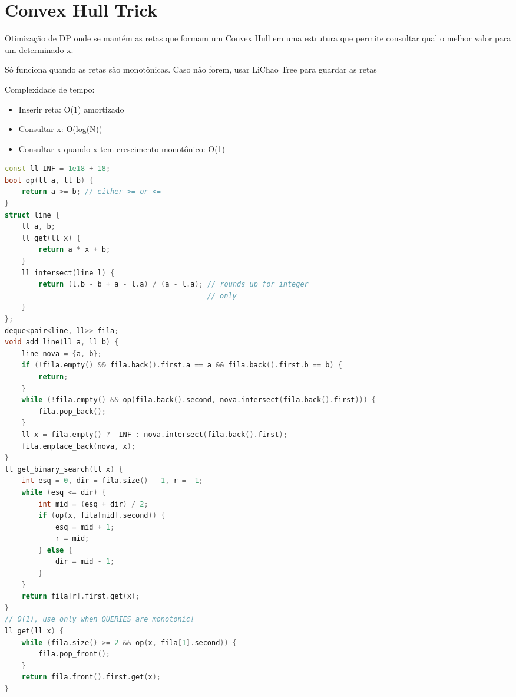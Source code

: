 \documentclass[11pt, a4paper, oneside]{book}
\begin{document}
\hfill

\section{Convex Hull Trick}


Otimização de DP onde se mantém as retas que formam um Convex Hull em uma estrutura que permite consultar qual o melhor valor para um determinado x.



Só funciona quando as retas são monotônicas. Caso não forem, usar LiChao Tree para guardar as retas



Complexidade de tempo:



\begin{itemize}
\item Inserir reta: O(1) amortizado
\item Consultar x: O(log(N))
\item Consultar x quando x tem crescimento monotônico: O(1)
\end{itemize}

\hfill

\begin{multicols}{2}
\begin{lstlisting}[language=C++]
const ll INF = 1e18 + 18;
bool op(ll a, ll b) {
    return a >= b; // either >= or <=
}
struct line {
    ll a, b;
    ll get(ll x) {
        return a * x + b;
    }
    ll intersect(line l) {
        return (l.b - b + a - l.a) / (a - l.a); // rounds up for integer
                                                // only
    }
};
deque<pair<line, ll>> fila;
void add_line(ll a, ll b) {
    line nova = {a, b};
    if (!fila.empty() && fila.back().first.a == a && fila.back().first.b == b) {
        return;
    }
    while (!fila.empty() && op(fila.back().second, nova.intersect(fila.back().first))) {
        fila.pop_back();
    }
    ll x = fila.empty() ? -INF : nova.intersect(fila.back().first);
    fila.emplace_back(nova, x);
}
ll get_binary_search(ll x) {
    int esq = 0, dir = fila.size() - 1, r = -1;
    while (esq <= dir) {
        int mid = (esq + dir) / 2;
        if (op(x, fila[mid].second)) {
            esq = mid + 1;
            r = mid;
        } else {
            dir = mid - 1;
        }
    }
    return fila[r].first.get(x);
}
// O(1), use only when QUERIES are monotonic!
ll get(ll x) {
    while (fila.size() >= 2 && op(x, fila[1].second)) {
        fila.pop_front();
    }
    return fila.front().first.get(x);
}
\end{lstlisting}
\end{multicols}
\end{document}
